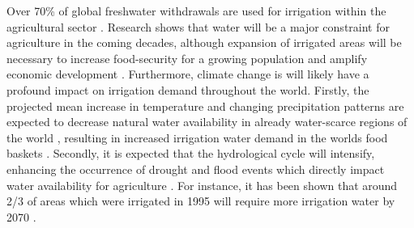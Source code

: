 \documentclass[hess, manuscript]{copernicus}
\begin{document}
\newpage
\introduction 
\label{sec:introduction}
Over 70\% of global freshwater withdrawals are used for irrigation within the agricultural sector \citep{Shiklomanov2000, Foley2011}. Research shows that water will be a major constraint for agriculture in the coming decades, although expansion of irrigated areas will be necessary to increase food-security for a growing population and amplify economic development \citep{Rijsberman_2006}. Furthermore, climate change is will likely have a profound impact on irrigation demand throughout the world. Firstly, the projected mean increase in temperature and changing precipitation patterns are expected to decrease natural water availability in already water-scarce regions of the world \citep{Voeroesmarty2000,Rockstroem2012,Kummu2016}, resulting in increased irrigation water demand in the worlds food baskets \citep{Rijsberman_2006}. Secondly, it is expected that the hydrological cycle will intensify, enhancing the occurrence of drought and flood events which directly impact water availability for agriculture \citep{allan2008atmospheric}. For instance, it has been shown that around 2/3 of areas which were irrigated in 1995 will require more irrigation water by 2070 \citep{Doell2002}.\\
\end{document}
